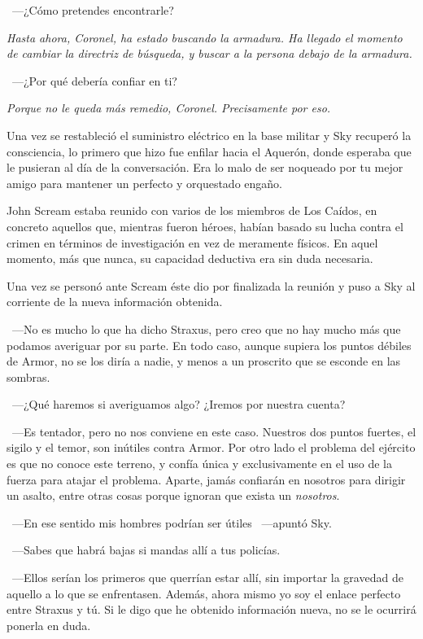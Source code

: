~---¿Cómo pretendes encontrarle?

\emph{Hasta ahora, Coronel, ha estado buscando la armadura. Ha llegado el momento de cambiar la directriz de búsqueda, y buscar a la persona debajo de la armadura.}

~---¿Por qué debería confiar en ti?

\emph{Porque no le queda más remedio, Coronel. Precisamente por eso.}

\bigskip\noindent
Una vez se restableció el suministro eléctrico en la base militar y Sky recuperó la consciencia, lo primero que hizo fue enfilar hacia el Aquerón, donde esperaba que le pusieran al día de la conversación. Era lo malo de ser noqueado por tu mejor amigo para mantener un perfecto y orquestado engaño.

John Scream estaba reunido con varios de los miembros de Los Caídos, en concreto aquellos que, mientras fueron héroes, habían basado su lucha contra el crimen en términos de investigación en vez de meramente físicos. En aquel momento, más que nunca, su capacidad deductiva era sin duda necesaria.

Una vez se personó ante Scream éste dio por finalizada la reunión y puso a Sky al corriente de la nueva información obtenida.

~---No es mucho lo que ha dicho Straxus, pero creo que no hay mucho más que podamos averiguar por su parte. En todo caso, aunque supiera los puntos débiles de Armor, no se los diría a nadie, y menos a un proscrito que se esconde en las sombras.

~---¿Qué haremos si averiguamos algo? ¿Iremos por nuestra cuenta?

~---Es tentador, pero no nos conviene en este caso. Nuestros dos puntos fuertes, el sigilo y el temor, son inútiles contra Armor. Por otro lado el problema del ejército es que no conoce este terreno, y confía única y exclusivamente en el uso de la fuerza para atajar el problema. Aparte, jamás confiarán en nosotros para dirigir un asalto, entre otras cosas porque ignoran que exista un \emph{nosotros}.

~---En ese sentido mis hombres podrían ser útiles ~---apuntó Sky.

~---Sabes que habrá bajas si mandas allí a tus policías.

~---Ellos serían los primeros que querrían estar allí, sin importar la gravedad de aquello a lo que se enfrentasen. Además, ahora mismo yo soy el enlace perfecto entre Straxus y tú. Si le digo que he obtenido información nueva, no se le ocurrirá ponerla en duda.

